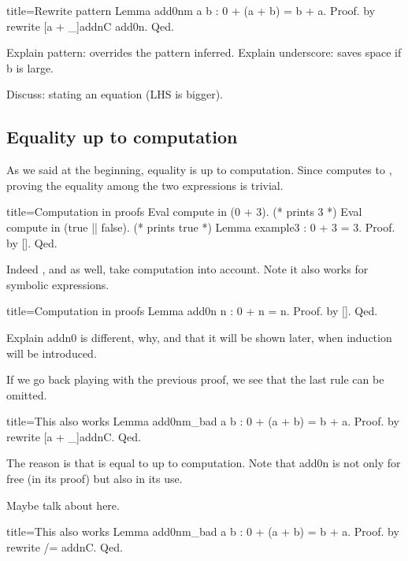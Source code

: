 \begin{coq}{title=Rewrite pattern}
Lemma add0nm a b : 0 + (a + b) = b + a.
Proof. by rewrite [a + _]addnC add0n. Qed.
\end{coq}

Explain pattern: overrides the pattern inferred.
Explain underscore: saves space if b is large.

Discuss: stating an equation (LHS is bigger).

\subsection{Equality up to computation}

As we said at the beginning, equality is up to computation.
Since  computes to , proving the equality among
the two expressions is trivial.

\begin{coq}{title=Computation in proofs}
Eval compute in (0 + 3).  (* prints 3 *)
Eval compute in (true || false).  (* prints true *)
Lemma example3 : 0 + 3 = 3.
Proof. by []. Qed.
\end{coq}

Indeed , and  as well, take computation
into account.
Note it also works for symbolic expressions.

\begin{coq}{title=Computation in proofs}
Lemma add0n n : 0 + n = n.
Proof. by []. Qed.
\end{coq}

Explain addn0 is different, why, and that it will be shown later,
when induction will be introduced.

If we go back playing with the previous proof, we see that the
last rule can be omitted.

\begin{coq}{title=This also works}
Lemma add0nm_bad a b : 0 + (a + b) = b + a.
Proof. by rewrite [a + _]addnC. Qed.
\end{coq}

The reason is that  is equal
to  up to computation.
Note that add0n  is not only for free (in its proof) but
also in its use.

Maybe talk about \C{/=} here.

\begin{coq}{title=This also works}
Lemma add0nm_bad a b : 0 + (a + b) = b + a.
Proof. by rewrite /= addnC. Qed.
\end{coq}

